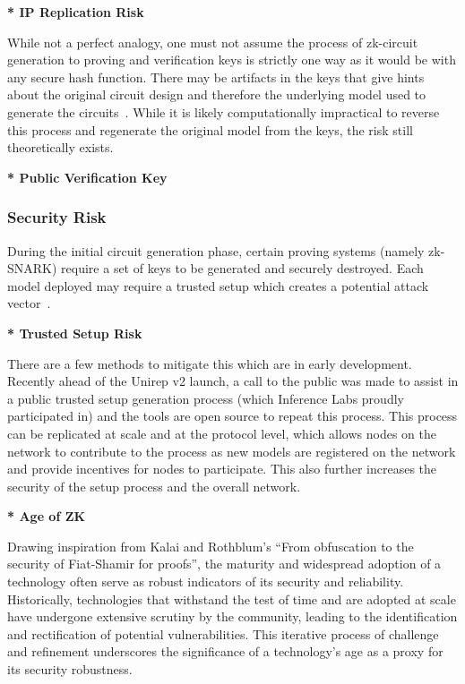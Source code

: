 \documentclass[conference]{IEEEtran}
\begin{document}
\textbf{* IP Replication Risk}

While not a perfect analogy, one must not assume the process of zk-circuit generation to proving and veriﬁcation keys is strictly one way as it would be with any secure hash function. There may be artifacts in the keys that give hints about the original circuit design and therefore the underlying model used to generate the circuits~\cite{BenSasson2014SuccinctNZ}. While it is likely computationally impractical to reverse this process and regenerate the original model from the keys, the risk still theoretically exists.

\textbf{* Public Veriﬁcation Key}

\subsubsection{Security Risk}

During the initial circuit generation phase, certain proving systems (namely zk-SNARK) require a set of keys to be generated and securely destroyed. Each model deployed may require a trusted setup which creates a potential attack vector~\cite{Bowe2017ScalableMC}.

\textbf{* Trusted Setup Risk}

There are a few methods to mitigate this which are in early development. Recently ahead of the Unirep v2 launch, a call to the public was made to assist in a public trusted setup generation process (which Inference Labs proudly participated in) and the tools are open source to repeat this process. This process can be replicated at scale and at the protocol level, which allows nodes on the network to contribute to the process as new models are registered on the network and provide incentives for nodes to participate. This also further increases the security of the setup process and the overall network.


\textbf{* Age of ZK}

Drawing inspiration from Kalai and Rothblum’s “From obfuscation to the security of Fiat-Shamir for proofs”, the maturity and widespread adoption of a technology often serve as robust indicators of its security and reliability. Historically, technologies that withstand the test of time and are adopted at scale have undergone extensive scrutiny by the community, leading to the identiﬁcation and rectiﬁcation of potential vulnerabilities. This iterative process of challenge and reﬁnement underscores the signiﬁcance of a technology’s age as a proxy for its security robustness.
\end{document}
